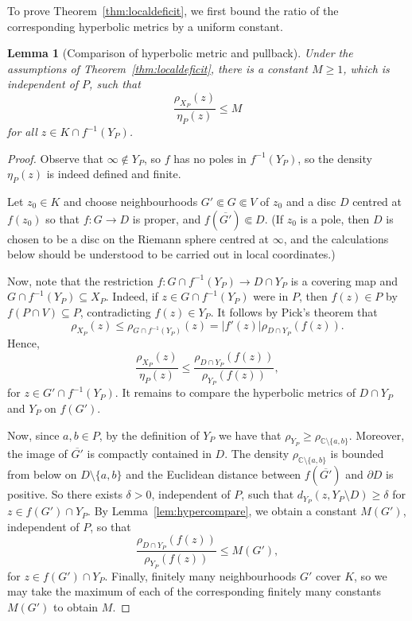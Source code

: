 \documentclass[12pt,a4paper,reqno]{amsart}
\theoremstyle{plain}
\newtheorem{lem}[thm]{Lemma}
\renewcommand{\subset}{\subseteq}
\theoremstyle{definition}
\theoremstyle{remark}
\numberwithin{equation}{section}
\newcommand \C{\mathbb{C}}
\begin{document}
To prove Theorem~\ref{thm:localdeficit}, we first
 bound the ratio of the corresponding
 hyperbolic metrics by a uniform constant. 

\begin{lem}[Comparison of hyperbolic metric and pullback]\label{lem:localratio}
Under the assumptions of  Theorem~\ref{thm:localdeficit},
there is a constant $M\geq 1$, which is 
independent of $P$, such that
\[
 \frac{\rho_{X_P}(z)}{\eta_P(z)}\leq  M
\]
for all $z\in K\cap f^{-1}(Y_P)$. 
\end{lem}
\begin{proof}
Observe that $\infty\notin Y_P$, so $f$
has no poles in $f^{-1}(Y_P)$, so
the density $\eta_P(z)$ is indeed 
defined and finite.

Let $z_0\in K$ and choose neighbourhoods $G'\Subset G\Subset V$ of $z_0$ and a disc $D$ centred at $f(z_0)$ so that $f\colon G \rightarrow D$ is proper, and $f(\overline{G'})\Subset D$.
(If $z_0$ is a pole, then $D$ is chosen to be
a disc on the Riemann sphere centred 
at $\infty$, and the calculations below
should be understood to be carried out
in local coordinates.)

Now, note that the restriction $f\colon G \cap f^{-1}(Y_P) \to D \cap Y_P$ is a covering map and $G\cap f^{-1}(Y_P)\subset X_P$. Indeed, if $z \in G\cap f^{-1}(Y_P)$ were in $P$, then $f(z)\in P$  by $f(P\cap V)\subset P$, contradicting $f(z)\in Y_P$.
It follows by Pick's theorem that
    \[\rho_{X_P}(z) \leq \rho_{G\cap f^{-1}(Y_P)}(z)=|f'(z)|\rho_{D\cap Y_P}(f(z)).\]
    Hence,
    \[\frac{\rho_{X_P}(z)}{\eta_P(z)}\leq \frac{\rho_{D\cap Y_P}(f(z))}{\rho_{Y_P}(f(z))}, \]
    for $z\in G' \cap f^{-1}(Y_P)$.
    It remains to compare the hyperbolic metrics of $D\cap Y_P$ and $Y_P$ on $f(G')$.

Now, since $a,b\in P$, by the definition of $Y_P$ we have that $\rho_{Y_P}\geq \rho_{\C\setminus\{a,b\}}$. Moreover, the image of $\overline{G'}$ is compactly contained in $D$. The density $\rho_{\C\setminus\{a,b\}}$ is bounded from below on $D\setminus \{a,b\}$ and the Euclidean distance between $f(\overline{G'})$ and  $\partial D$ is positive. So there exists $\delta>0$, independent of $P$, such that $d_{Y_P}(z,Y_P\setminus D)\geq \delta$ for $z\in f(G')\cap Y_P$.
By Lemma~\ref{lem:hypercompare}, we obtain a constant $M(G')$, independent of $P$, so that
\[\frac{\rho_{D\cap Y_P}(f(z))}{\rho_{Y_P}(f(z))} \leq M(G'),\]
for $z\in f(G')\cap Y_P$.
Finally, finitely many neighbourhoods $G'$ cover $K$, so we may take the maximum of each of the corresponding 
finitely many constants $M(G')$ to obtain $M$.   
\end{proof}
\end{document}

